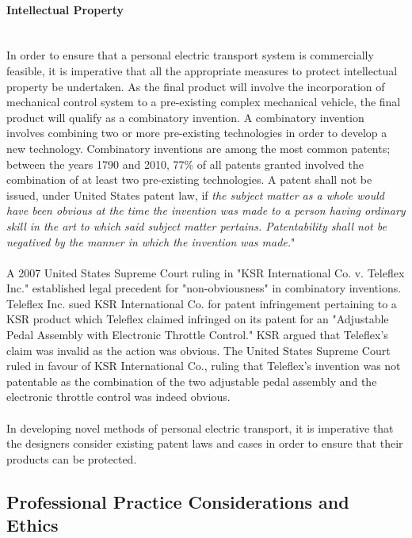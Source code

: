 \paragraph{Intellectual Property}\mbox{}\\
In order to ensure that a personal electric transport system is commercially feasible, it is imperative that all the appropriate measures to protect intellectual property be undertaken. 
As the final product will involve the incorporation of mechanical control system to a pre-existing complex mechanical vehicle, the final product will qualify as a combinatory invention. 
A combinatory invention involves combining two or more pre-existing technologies in order to develop a new technology. 
Combinatory inventions are among the most common patents; between the years 1790 and 2010, 77\% of all patents granted involved the combination of at least two pre-existing technologies. \cite{COMB} 
A patent shall not be issued, under United States patent law, if \emph{the subject matter as a whole would have been obvious at the time the invention was made to a person having ordinary skill in the art to which said subject matter pertains. 
	Patentability shall not be negatived by the manner in which the invention was made.}" \cite{NonObv} 
\\
\\
A 2007 United States Supreme Court ruling in "KSR International Co. v. Teleflex Inc." established legal precedent for "non-obviousness" in combinatory inventions. 
Teleflex Inc. sued KSR International Co. for patent infringement pertaining to a KSR product which Teleflex claimed infringed on its patent for an "Adjustable Pedal Assembly with Electronic Throttle Control."
KSR argued that Teleflex's claim was invalid as the action was obvious. 
The United States Supreme Court ruled in favour of KSR International Co.,  
ruling that Teleflex's invention was not patentable as the combination of the two adjustable pedal assembly and the electronic throttle control was indeed obvious. 
\\
\\
In developing novel methods of personal electric transport, it is imperative that the designers consider existing patent laws and cases in order to ensure that their products can be protected.

\subsection{Professional Practice Considerations and Ethics}

